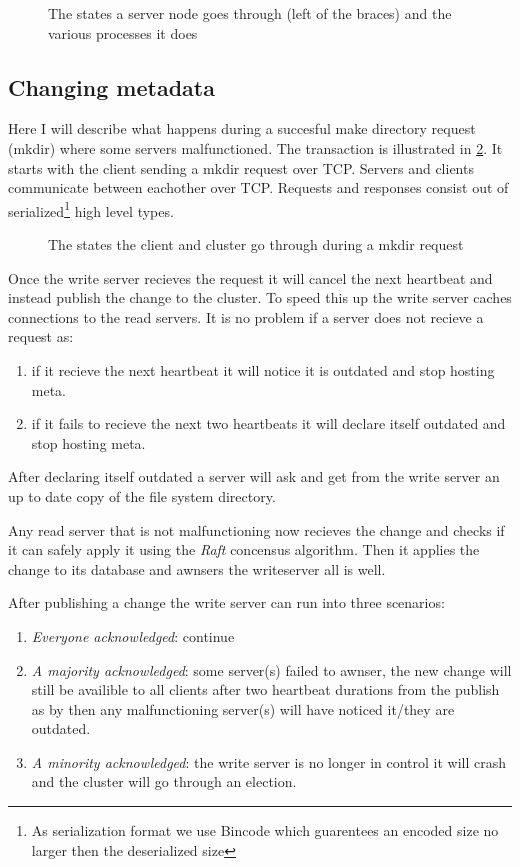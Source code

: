 \begin{figure}[htbp]
	\centering
	
	\caption{The states a server node goes through (left of the braces) and the various processes it does}
	\label{fig:nodelife}
\end{figure}

\subsection{Changing metadata}
Here I will describe what happens during a succesful make directory request (mkdir) where some servers malfunctioned. The transaction is illustrated in \cref{fig:mkdir}. It starts with the client sending a mkdir request over TCP. Servers and clients communicate between eachother over TCP. Requests and responses consist out of serialized\footnote{As serialization format we use Bincode which guarentees an encoded size no larger then the deserialized size} high level types. 

\begin{figure}[htbp]
	\centering
	
	\caption{The states the client and cluster go through during a mkdir request}
	\label{fig:mkdir}
\end{figure}

Once the write server recieves the request it will cancel the next heartbeat and instead publish the change to the cluster. To speed this up the write server caches connections to the read servers. It is no problem if a server does not recieve a request as:
\begin{enumerate}
	\item if it recieve the next heartbeat it will notice it is outdated and stop hosting meta. 
	\item if it fails to recieve the next two heartbeats it will declare itself outdated and stop hosting meta.
\end{enumerate}
After declaring itself outdated a server will ask and get from the write server an up to date copy of the file system directory. 

Any read server that is not malfunctioning now recieves the change and checks if it can safely apply it using the \textit{Raft} concensus algorithm. Then it applies the change to its database and awnsers the writeserver all is well.

After publishing a change the write server can run into three scenarios:
\begin{enumerate}
	\item \textit{Everyone acknowledged}: continue
	\item \textit{A majority acknowledged}: some server(s) failed to awnser, the new change will still be availible to all clients after two heartbeat durations from the publish as by then any malfunctioning server(s) will have noticed it/they are outdated.
	\item \textit{A minority acknowledged}: the write server is no longer in control it will crash and the cluster will go through an election.
\end{enumerate}

